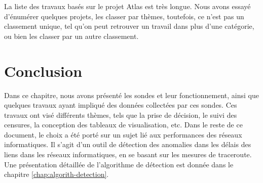 La liste des travaux basés sur le projet  Atlas est très longue. Nous avons essayé d'énumérer quelques projets, les classer par thèmes, toutefois, ce n'est pas un classement unique, tel qu'on peut retrouver un travail dans plus d'une catégorie, ou bien les classer par un autre classement.

\section{Conclusion}

Dans ce chapitre, nous avons présenté les sondes  et leur fonctionnement, ainsi que quelques travaux ayant impliqué des données collectées par ces sondes.  Ces travaux ont visé différents thèmes, tels que la prise de décision, le suivi des censures, la conception des tableaux de visualisation, etc. Dans le reste de ce document, le choix a été porté sur un sujet lié aux performances des réseaux informatiques. Il s'agit d'un outil de détection des anomalies dans les délais des liens dans les réseaux informatiques, en se basant sur les mesures de traceroute. Une présentation détaillée de l'algorithme de détection est donnée dans le chapitre \ref{chap:algorith-detection}.






